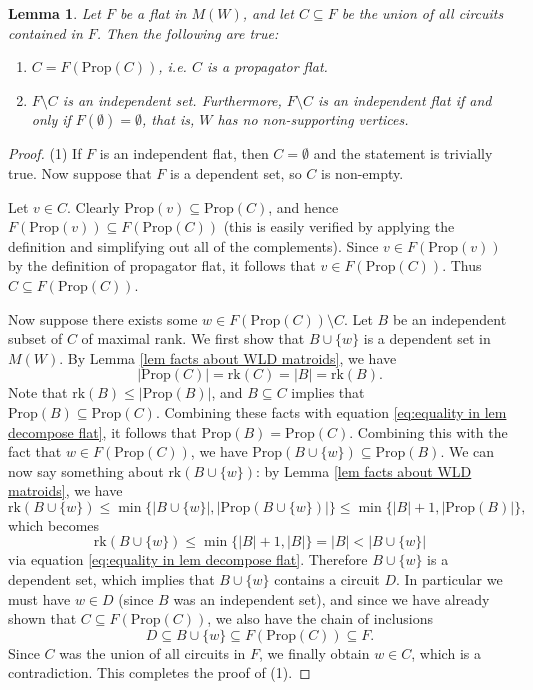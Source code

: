 \documentclass[11pt]{article}
\newcommand{\rk}{\textrm{rk} }
\newcommand{\Prop}{\textrm{Prop}}
\newtheorem{lem}[thm]{Lemma}
\theoremstyle{remark}
\theoremstyle{definition}
\begin{document}
\begin{lem} \label{lem decompose flat}Let $F$ be a flat in $M(W)$, and let $C \subseteq F$ be the union of all circuits contained in $F$. Then the following are true:
\begin{enumerate}
\item $C = F(\Prop (C))$, i.e. $C$ is a propagator flat.
\item $F \setminus C$ is an independent set. Furthermore, $F\setminus C$ is an independent flat if and only if $F(\emptyset) = \emptyset$, that is, $W$ has no non-supporting vertices.  
\end{enumerate}
\end{lem}

\begin{proof}
(1) If $F$ is an independent flat, then $C = \emptyset$ and the statement is trivially true. Now suppose that $F$ is a dependent set, so $C$ is non-empty.

Let $v \in C$. Clearly $\Prop(v) \subseteq \Prop(C)$, and hence $F(\Prop(v)) \subseteq F(\Prop(C))$ (this is easily verified by applying the definition and simplifying out all of the complements). Since $v \in F(\Prop(v))$ by the definition of propagator flat, it follows that $v \in F(\Prop(C))$. Thus $C \subseteq F(\Prop(C))$.

Now suppose there exists some $w \in  F(\Prop(C)) \setminus C$. Let $B$ be an independent subset of $C$ of maximal rank. We first show that $B \cup \{w\}$ is a dependent set in $M(W)$. By Lemma \ref{lem facts about WLD matroids}, we have
\begin{equation}\label{eq:equality in lem decompose flat} |\Prop(C)| = \rk(C) = |B| = \rk(B) .\end{equation}
Note that $\rk(B) \leq |\Prop(B)|$, and $B \subseteq C$ implies that $\Prop(B) \subseteq \Prop(C)$. Combining these facts with equation \eqref{eq:equality in lem decompose flat}, it follows that $\Prop(B) = \Prop(C)$. Combining this with the fact that $w \in F(\Prop(C))$, we have $\Prop(B\cup \{w\}) \subseteq \Prop(B)$. We can now say something about $\rk(B\cup \{w\})$: by Lemma \ref{lem facts about WLD matroids}, we have 
\[
\rk (B \cup \{w\}) \leq \min\{|B\cup \{w\}|, |\Prop(B\cup \{w\})|\} \leq \min\{|B|+1,|\Prop(B)|\},
\]
which becomes 
\[\rk(B\cup \{w\}) \leq \min\{|B|+1,|B|\} = |B| < |B \cup\{w\}|\]
via equation \eqref{eq:equality in lem decompose flat}. Therefore $B\cup\{w\}$ is a dependent set, which implies that $B\cup \{w\}$ contains a circuit $D$. In particular we must have $w \in D$ (since $B$ was an independent set), and since we have already shown that $C \subseteq F(\Prop(C))$, we also have the chain of inclusions 
\[D \subseteq B\cup \{w\} \subseteq F(\Prop(C)) \subseteq F.\]
Since $C$ was the union of all circuits in $F$, we finally obtain $w \in C$, which is a contradiction. This completes the proof of (1).



\end{proof}
\end{document}
